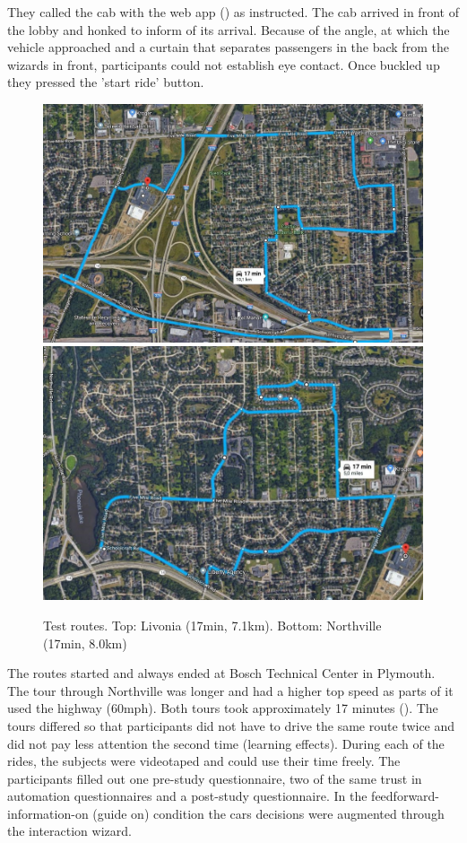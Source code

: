 They called the cab with the web app (\emph{}) as instructed. The cab arrived in front of the lobby and honked to inform of its arrival. Because of the angle, at which the vehicle approached and a curtain that separates passengers in the back from the wizards in front, participants could not establish eye contact. Once buckled up they pressed the 'start ride' button. 
\begin{figure}
     \includegraphics[width=\textwidth]{fig/RouteA_Mittel.JPG}\hfill\includegraphics[width=\textwidth]{fig/RouteB_Mittel.JPG}
    \caption[Test routes]{Test routes. Top: Livonia (17min, 7.1km). Bottom: Northville (17min, 8.0km)}
    \label{fig:routes}
\end{figure}
The routes started and always ended at Bosch Technical Center in Plymouth. The tour through Northville was longer and had a higher top speed as parts of it used the highway (60mph). Both tours took approximately 17 minutes (\emph{}). The tours differed so that participants did not have to drive the same route twice and did not pay less attention the second time (learning effects). 
During each of the rides, the subjects were videotaped and could use their time freely. The participants filled out one pre-study questionnaire, two of the same trust in automation questionnaires \citep{Jian2010,Koo2015} and a post-study questionnaire. In the feedforward-information-on (guide on) condition the cars decisions were augmented through the interaction wizard. 


